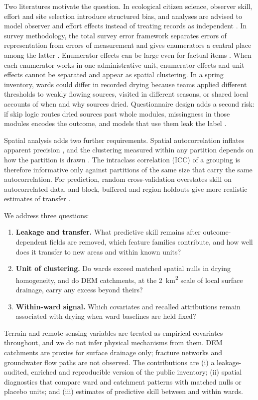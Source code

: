 \documentclass[preprint,12pt,authoryear]{elsarticle}
\begin{document}
Two literatures motivate the question. In ecological citizen science, observer skill, effort and site selection introduce structured bias, and analyses are advised to model observer and effort effects instead of treating records as independent \citep{bird2014statistical, isaac2014statistics, johnston2021analytical}. In survey methodology, the total survey error framework separates errors of representation from errors of measurement and gives enumerators a central place among the latter \citep{groves2010total}. Enumerator effects can be large even for factual items \citep{west2017interviewer, dimaio2020enumerator}. When each enumerator works in one administrative unit, enumerator effects and unit effects cannot be separated and appear as spatial clustering. In a spring inventory, wards could differ in recorded drying because teams applied different thresholds to weakly flowing sources, visited in different seasons, or shared local accounts of when and why sources dried. Questionnaire design adds a second risk: if skip logic routes dried sources past whole modules, missingness in those modules encodes the outcome, and models that use them leak the label \citep{kaufman2012leakage, kapoor2023leakage}.

Spatial analysis adds two further requirements. Spatial autocorrelation inflates apparent precision \citep{legendre1993spatial, dormann2007methods}, and the clustering measured within any partition depends on how the partition is drawn \citep{fotheringham1991modifiable}. The intraclass correlation (ICC) of a grouping is therefore informative only against partitions of the same size that carry the same autocorrelation. For prediction, random cross-validation overstates skill on autocorrelated data, and block, buffered and region holdouts give more realistic estimates of transfer \citep{roberts2017cross, valavi2019blockcv, ploton2020spatial, meyer2022machine}.

We address three questions:
\begin{enumerate}
  \item \textbf{Leakage and transfer.} What predictive skill remains after outcome-dependent fields are removed, which feature families contribute, and how well does it transfer to new areas and within known units?
  \item \textbf{Unit of clustering.} Do wards exceed matched spatial nulls in drying homogeneity, and do DEM catchments, at the \SI{2}{\kilo\metre\squared} scale of local surface drainage, carry any excess beyond theirs?
  \item \textbf{Within-ward signal.} Which covariates and recalled attributions remain associated with drying when ward baselines are held fixed?
\end{enumerate}
Terrain and remote-sensing variables are treated as empirical covariates throughout, and we do not infer physical mechanisms from them. DEM catchments are proxies for surface drainage only; fracture networks and groundwater flow paths are not observed. The contributions are (i) a leakage-audited, enriched and reproducible version of the public inventory; (ii) spatial diagnostics that compare ward and catchment patterns with matched nulls or placebo units; and (iii) estimates of predictive skill between and within wards.
\end{document}

